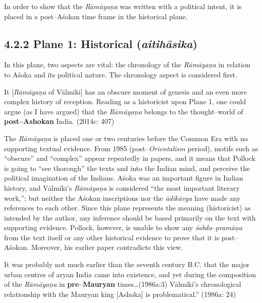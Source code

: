 In order to show that the \textit{Rāmāyaṇa} was written with a political intent, it is placed in a post–Aśokan time frame in the historical plane.


\subsection*{4.2.2 Plane 1: Historical ({\it {\bfseries aitihāsika}})}

In this plane, two aspects are vital: the chronology of the \textit{Rāmāyaṇa} in relation to Aśoka and its political nature. The chronology aspect is considered first.

\begin{myquote}
It [\textit{Rāmāyaṇa} of Vālmīki] has an obscure moment of genesis and an even more complex history of reception. Reading as a historicist upon Plane 1, one could argue (as I have argued) that the \textit{Rāmāyaṇa} belongs to the thought–world of \textbf{post–Ashokan} India. (2014c: 407)
\end{myquote}

The \textit{Rāmāyaṇa} is placed one or two centuries before the Common Era with no supporting textual evidence. From 1985 (post–\textit{Orientalism} period), motifs such as “obscure” and “complex” appear repeatedly in papers, and it means that Pollock is going to “see thorough” the texts and into the Indian mind, and perceive the political imagination of the Indians. Aśoka was an important figure in Indian history, and Vālmīki’s \textit{Rāmāyaṇa }is considered “the most important literary work,”; but neither the Aśokan inscriptions nor the \textit{ādikāvya} have made any references to each other. Since this plane represents the meaning (historicist) as intended by the author, any inference should be based primarily on the text with supporting evidence. Pollock, however, is unable to show any\textit{ śabda}–\textit{pramāṇa} from the text itself or any other historical evidence to prove that it is post–Aśokan. Moreover, his earlier paper contradicts this view.

\begin{myquote}
It was probably not much earlier than the seventh century B.C. that the major urban centres of aryan India came into existence, and yet during the composition of the \textit{Rāmāyaṇa} in \textbf{pre–Mauryan} times…(1986a:3) Vālmīki’s chronological relationship with the Mauryan king [Ashoka] is problematical.” (1986a: 24)
\end{myquote}

